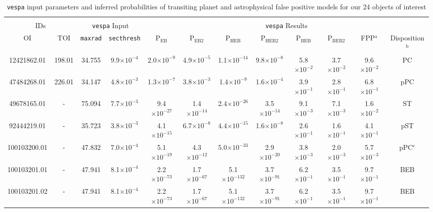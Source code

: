 \clearpage
\begin{landscape}
\begin{table*}
  \small
  \renewcommand{\arraystretch}{0.7}
  \caption{\texttt{vespa} input parameters and inferred probabilities of transiting planet and astrophysical false positive models for our 24 objects of interest}
  \label{oriontable:vespa}
  \begin{tabular}{cc|cc|cccccccc}
    \hline \\ [-1ex]
    \multicolumn{2}{c}{IDs} & \multicolumn{2}{c}{\texttt{vespa} Input} & \multicolumn{8}{c}{\texttt{vespa} Results} \\
    OI & TOI & \texttt{maxrad} & \texttt{secthresh} & $\text{P}_{\text{EB}}$ & $\text{P}_{\text{EB}2}$ & $\text{P}_{\text{HEB}}$ & $\text{P}_{\text{HEB}2}$ & $\text{P}_{\text{BEB}}$ & $\text{P}_{\text{BEB}2}$ & FPP$^{\text{a}}$ & Disposition$^{\text{b}}$ \\
    \hline
    12421862.01 & 198.01 & 34.755 & 9.9$\times 10^{-4}$ & 2.0$\times 10^{-9}$ & 4.9$\times 10^{-5}$ & 1.1$\times 10^{-14}$ & 9.8$\times 10^{-8}$ & 5.8$\times 10^{-2}$ & 3.7$\times 10^{-2}$ & 9.6$\times 10^{-2}$ & PC \\ 
    47484268.01 & 226.01 & 34.147 & 4.8$\times 10^{-3}$ & 1.3$\times 10^{-7}$ & 3.8$\times 10^{-3}$ & 1.4$\times 10^{-9}$ & 1.6$\times 10^{-4}$ & 3.9$\times 10^{-1}$ & 2.8$\times 10^{-1}$ & 6.8$\times 10^{-1}$ & pPC \\ 
    49678165.01 & - & 75.094 & 7.7$\times 10^{-3}$ & 9.4$\times 10^{-27}$ & 1.4$\times 10^{-14}$ & 2.4$\times 10^{-26}$ & 3.5$\times 10^{-14}$ & 9.1$\times 10^{-3}$ & 7.1$\times 10^{-3}$ & 1.6$\times 10^{-2}$ & ST \\ 
    92444219.01 & - & 35.723 & 3.8$\times 10^{-3}$ & 4.1$\times 10^{-15}$ & 6.7$\times 10^{-8}$ & 4.4$\times 10^{-15}$ & 1.6$\times 10^{-8}$ & 2.6$\times 10^{-1}$ & 1.6$\times 10^{-1}$ & 4.1$\times 10^{-1}$ & pST \\ 
    100103200.01 & - & 47.832 & 7.0$\times 10^{-4}$ & 5.1$\times 10^{-19}$ & 4.3$\times 10^{-12}$ & 5.0$\times 10^{-33}$ & 2.9$\times 10^{-20}$ & 3.8$\times 10^{-3}$ & 2.0$\times 10^{-3}$ & 5.7$\times 10^{-3}$ & pPC$^{\text{c}}$ \\ 
    100103201.01 & - & 47.941 & 8.1$\times 10^{-4}$ & 2.2$\times 10^{-73}$ & 1.7$\times 10^{-67}$ & 5.1$\times 10^{-132}$ & 3.7$\times 10^{-91}$ & 6.2$\times 10^{-1}$ & 3.5$\times 10^{-1}$ & 9.7$\times 10^{-1}$ & BEB \\ 
    100103201.02 & - & 47.941 & 8.1$\times 10^{-4}$ & 2.2$\times 10^{-73}$ & 1.7$\times 10^{-67}$ & 5.1$\times 10^{-132}$ & 3.7$\times 10^{-91}$ & 6.2$\times 10^{-1}$ & 3.5$\times 10^{-1}$ & 9.7$\times 10^{-1}$ & BEB \\ 

\end{tabular}
\end{table*}
\end{landscape}
